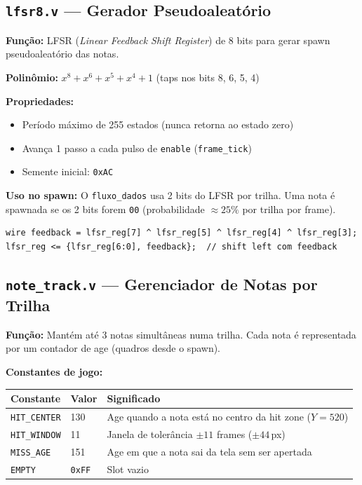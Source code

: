 \documentclass[12pt,a4paper]{article}
\begin{document}
\subsection{\texttt{lfsr8.v} — Gerador Pseudoaleatório}

\textbf{Função:} LFSR (\emph{Linear Feedback Shift Register}) de 8 bits para gerar spawn pseudoaleatório das notas.

\textbf{Polinômio:} $x^8 + x^6 + x^5 + x^4 + 1$ \quad (taps nos bits 8, 6, 5, 4)

\textbf{Propriedades:}
\begin{itemize}
    \item Período máximo de 255 estados (nunca retorna ao estado zero)
    \item Avança 1 passo a cada pulso de \texttt{enable} (\texttt{frame\_tick})
    \item Semente inicial: \texttt{0xAC}
\end{itemize}

\textbf{Uso no spawn:} O \texttt{fluxo\_dados} usa 2 bits do LFSR por trilha. Uma nota é spawnada se os 2 bits forem \texttt{00} (probabilidade $\approx 25\%$ por trilha por frame).

\begin{lstlisting}[style=verilog, caption={Lógica de feedback do LFSR8.}]
wire feedback = lfsr_reg[7] ^ lfsr_reg[5] ^ lfsr_reg[4] ^ lfsr_reg[3];
lfsr_reg <= {lfsr_reg[6:0], feedback};  // shift left com feedback
\end{lstlisting}

\subsection{\texttt{note\_track.v} — Gerenciador de Notas por Trilha}

\textbf{Função:} Mantém até 3 notas simultâneas numa trilha. Cada nota é representada por um contador de age (quadros desde o spawn).

\textbf{Constantes de jogo:}
\begin{center}
\begin{tabular}{lll}
\toprule
\textbf{Constante} & \textbf{Valor} & \textbf{Significado} \\
\midrule
\texttt{HIT\_CENTER} & 130 & Age quando a nota está no centro da hit zone ($Y=520$) \\
\texttt{HIT\_WINDOW} & 11  & Janela de tolerância $\pm11$ frames ($\pm44$\,px) \\
\texttt{MISS\_AGE}   & 151 & Age em que a nota sai da tela sem ser apertada \\
\texttt{EMPTY}       & \texttt{0xFF} & Slot vazio \\
\bottomrule
\end{tabular}
\end{center}
\end{document}
